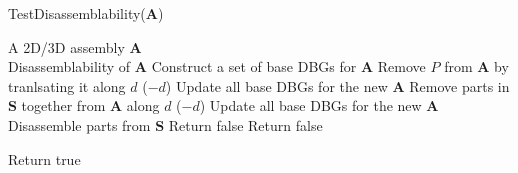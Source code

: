 \vspace*{-2mm}
\begin{algorithm}
	\caption{TestDisassemblability($\mathbf{A}$)\ \vspace*{-2mm}}
	\label{alg:DisasssTest}
	\vspace*{1.0mm}
	\KwIn
	{
		\hspace{3.0mm}A 2D/3D assembly $\mathbf{A}$ \\
	}
	\vspace*{0.5mm}
	\KwOut
	{
		\hspace{0.1mm} Disassemblability of $\mathbf{A}$
	}
	\vspace*{2mm}
	Construct a set of base DBGs for $\mathbf{A}$ \;
	{
		\vspace*{0.5mm}
		{
			Remove $P$ from $\mathbf{A}$ by tranlsating it along $d$ ($-d$) \;
			Update all base DBGs for the new $\mathbf{A}$ \;	
		}
		{
			{
				Remove parts in $\mathbf{S}$ together from $\mathbf{A}$ along $d$ ($-d$)  \;
				Update all base DBGs for the new $\mathbf{A}$ \;	
				Disassemble parts from $\mathbf{S}$ \;
			}
			\Else
			{
				Return false \;	
			}
		}
		\Else
		{
			Return false \;
		}
	}
	
	Return true \;
\end{algorithm}
\fi









